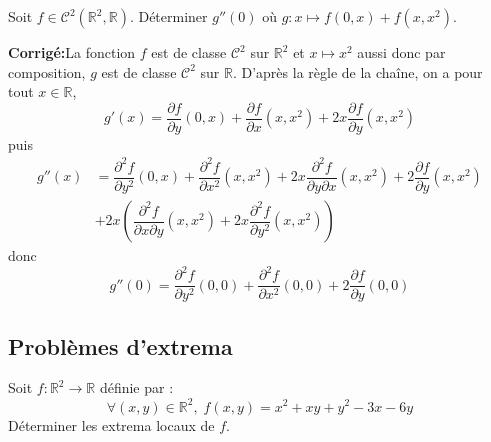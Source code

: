 \documentclass[a4paper,twoside,french,11pt]{VcCours}
\newcommand{\corr}{\textbf{Corrigé:}}
\begin{document}
\begin{Exercice}{} Soit $f \in \mathcal{C}^2(\mathbb{R}^2, \mathbb{R})$. Déterminer $g''(0)$ où $g : x \mapsto f(0,x)+f(x,x^2)$.
\end{Exercice}

\corr La fonction $f$ est de classe $\mathcal{C}^2$ sur $\mathbb{R}^2$ et $x \mapsto x^2$ aussi donc par composition, $g$ est de classe $\mathcal{C}^2$ sur $\mathbb{R}$. D'après la règle de la chaîne, on a pour tout $x \in \mathbb{R}$,
$$ g'(x) = \dfrac{\partial f}{\partial y}(0,x) + \dfrac{\partial f}{\partial x}(x,x^2) + 2x \dfrac{\partial f}{\partial y}(x,x^2)$$
puis 
\begin{align*}
 g''(x) & = \dfrac{\partial^2 f}{\partial y^2}(0,x) +  \dfrac{\partial^2 f}{\partial x^2}(x,x^2) + 2x  \dfrac{\partial^2 f}{ \partial y\partial x}(x,x^2) + 2 \dfrac{\partial f}{\partial y}(x,x^2) \\
 & + 2x \left( \dfrac{\partial^2 f}{ \partial x \partial y}(x,x^2) + 2x\dfrac{\partial^2 f}{\partial y^2}(x,x^2) \right)
 \end{align*}
 donc
 $$ g''(0) =  \dfrac{\partial^2 f}{\partial y^2}(0,0) +  \dfrac{\partial^2 f}{\partial x^2}(0,0) + 2 \dfrac{\partial f}{\partial y}(0,0) $$
 
 
  
 \subsection{Problèmes d'extrema}

\begin{Exercice}{} Soit $f : \mathbb{R}^2 \rightarrow \mathbb{R}$ définie par :
$$ \forall (x,y) \in \mathbb{R}^2, \; f(x,y) = x^{2} + xy + y^{2} - 3x - 6y$$
Déterminer les extrema locaux de $f$.
\end{Exercice}
\end{document}
